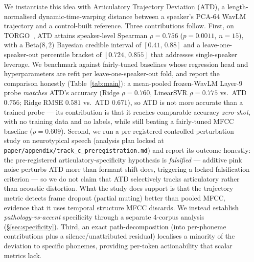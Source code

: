 We instantiate this idea with Articulatory Trajectory Deviation (ATD), a
length-normalised dynamic-time-warping distance between a speaker's
PCA-64 WavLM trajectory and a control-built reference. Three
contributions follow. First, on TORGO~\cite{Rudzicz2012TORGO}, ATD
attains speaker-level Spearman $\rho = 0.756$ ($p = 0.0011$, $n = 15$),
with a Beta(8,\,2) Bayesian credible interval of $[0.41,\,0.88]$ and a
leave-one-speaker-out percentile bracket of $[0.724,\,0.855]$ that
addresses single-speaker leverage. We benchmark against fairly-tuned
baselines whose regression head and hyperparameters are refit per
leave-one-speaker-out fold, and report the comparison honestly
(Table~\ref{tab:main}): a mean-pooled frozen-WavLM Layer-9 probe
\emph{matches} ATD's accuracy (Ridge $\rho = 0.760$, LinearSVR
$\rho = 0.775$ vs.\ ATD $0.756$; Ridge RMSE $0.581$ vs.\ ATD $0.671$),
so ATD is not more accurate than a trained probe --- its contribution is
that it reaches comparable accuracy \emph{zero-shot}, with no training
data and no labels, while still beating a fairly-tuned MFCC baseline
($\rho = 0.609$).
Second, we run a pre-registered controlled-perturbation study on
neurotypical speech (analysis plan locked at
\texttt{paper/appendix/track\_c\_preregistration.md}) and report its
outcome honestly: the pre-registered articulatory-specificity hypothesis
is \emph{falsified} --- additive pink noise perturbs ATD more than formant
shift does, triggering a locked falsification criterion --- so we do not
claim that ATD selectively tracks articulatory rather than acoustic
distortion. What the study does support is that the trajectory metric
detects frame dropout (partial muting) better than pooled MFCC, evidence
that it uses temporal structure MFCC discards. We instead establish
\emph{pathology-vs-accent} specificity through a separate 4-corpus
analysis (\S\ref{sec:specificity}). Third, an exact path-decomposition
(into per-phoneme contributions plus a silence/unattributed residual)
localises a minority of the deviation to specific phonemes, providing
per-token actionability that scalar metrics lack.
